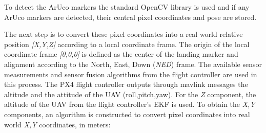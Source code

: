 \documentclass[conference]{IEEEtran}
\begin{document}
%
To detect the ArUco markers the standard OpenCV library is used and if
any ArUco markers are detected, their central pixel coordinates and
pose are stored.

The next step is to convert these pixel coordinates into a real world
relative position \emph{[X,Y,Z]} according to a local coordinate frame. The
origin of the local coordinate frame \emph{[0,0,0]} is defined as the
center of the landing marker and alignment according to the North,
East, Down (\emph{NED}) frame.
%
%
The available sensor measurements and sensor fusion algorithms from
the flight controller are used in this process. The PX4 flight
controller outputs through mavlink messages the altitude and the attitude of the UAV (roll,pitch,yaw). For the \emph{Z} component,
the altitude of the UAV from the flight controller's EKF is used. To
obtain the \emph{X,Y} components, an algorithm is constructed to convert
pixel coordinates into real world \emph{X,Y} coordinates, in meters:
%
%




\end{document}
